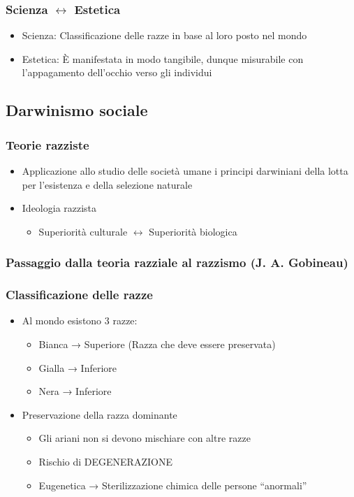\documentclass{article}
\begin{document}
\subsubsection{Scienza $\leftrightarrow$ Estetica}
\begin{itemize}
    \item Scienza: Classificazione delle razze in base al loro posto nel mondo
    \item Estetica: È manifestata in modo tangibile, dunque misurabile con l’appagamento dell’occhio verso gli individui
\end{itemize}

\subsection{Darwinismo sociale}

\subsubsection{Teorie razziste}
\begin{itemize}
    \item Applicazione allo studio delle società umane i principi darwiniani della lotta per l’esistenza e della selezione naturale
    \item Ideologia razzista
    \begin{itemize}
        \item Superiorità culturale $\leftrightarrow$ Superiorità biologica
    \end{itemize}
\end{itemize}

\subsubsection{Passaggio dalla teoria razziale al razzismo (J. A. Gobineau)}

\subsubsection{Classificazione delle razze}
\begin{itemize}
    \item Al mondo esistono 3 razze:
    \begin{itemize}
        \item Bianca → Superiore (Razza che deve essere preservata)
        \item Gialla → Inferiore
        \item Nera → Inferiore
    \end{itemize}
    \item Preservazione della razza dominante
    \begin{itemize}
        \item Gli ariani non si devono mischiare con altre razze
        \item Rischio di DEGENERAZIONE
        \item Eugenetica → Sterilizzazione chimica delle persone “anormali”
    \end{itemize}
\end{itemize}
\end{document}
